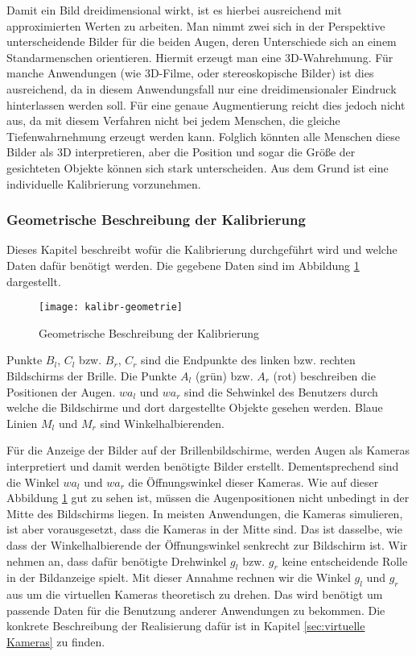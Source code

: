Damit ein Bild dreidimensional wirkt, ist es hierbei ausreichend mit approximierten Werten zu arbeiten.
Man nimmt zwei sich in der Perspektive unterscheidende Bilder für die beiden Augen, deren Unterschiede sich an einem Standarmenschen orientieren. 
Hiermit erzeugt man eine 3D-Wahrehmung. 
Für manche Anwendungen (wie 3D-Filme, oder stereoskopische Bilder) ist dies ausreichend, da in diesem Anwendungsfall nur eine dreidimensionaler Eindruck hinterlassen werden soll. 
Für eine genaue Augmentierung reicht dies jedoch nicht aus, da mit diesem Verfahren nicht bei jedem Menschen, die gleiche Tiefenwahrnehmung erzeugt werden kann.
Folglich könnten alle Menschen diese Bilder als 3D interpretieren, aber die Position und sogar die Größe der gesichteten Objekte können sich stark unterscheiden. 
Aus dem Grund ist eine individuelle Kalibrierung vorzunehmen.


\subsubsection{Geometrische Beschreibung der Kalibrierung}
\label{sec:Geometrische Beschreibung der Kalibrierung}
Dieses Kapitel beschreibt wofür die Kalibrierung durchgeführt wird und welche Daten dafür benötigt werden.
Die gegebene Daten sind im Abbildung \ref{fig:geom} dargestellt. 

\begin{figure}[h]
   \centering
   \texttt{[image: kalibr-geometrie]}
   \caption{Geometrische Beschreibung der Kalibrierung}
   \label{fig:geom}
\end{figure}

Punkte $B_{l}$, $C_{l}$ bzw. $B_{r}$, $C_{r}$ sind die Endpunkte des linken bzw. rechten Bildschirms der Brille.
Die Punkte $A_{l}$ (grün) bzw. $A_{r}$ (rot) beschreiben die Positionen der Augen.
$wa_{l}$ und $wa_{r}$ sind die Sehwinkel des Benutzers durch welche die Bildschirme und dort dargestellte Objekte gesehen werden. 
Blaue Linien $M_{l}$ und $M_{r}$ sind Winkelhalbierenden.

Für die Anzeige der Bilder auf der Brillenbildschirme, werden Augen als Kameras interpretiert und damit werden benötigte Bilder erstellt.
Dementsprechend sind die Winkel $wa_{l}$ und $wa_{r}$ die Öffnungswinkel dieser Kameras.
Wie auf dieser Abbildung \ref{fig:geom} gut zu sehen ist, müssen die Augenpositionen nicht unbedingt in der Mitte des Bildschirms liegen.
In meisten Anwendungen, die Kameras simulieren, ist aber vorausgesetzt, dass die Kameras in der Mitte sind.
Das ist dasselbe, wie dass der Winkelhalbierende der Öffnungswinkel senkrecht zur Bildschirm ist.
Wir nehmen an, dass dafür benötigte Drehwinkel $g_{l}$ bzw. $g_{r}$ keine entscheidende Rolle in der Bildanzeige spielt.
Mit dieser Annahme rechnen wir die Winkel $g_{l}$ und  $g_{r}$ aus  um die virtuellen Kameras theoretisch zu drehen.
Das wird benötigt um passende Daten für die Benutzung anderer Anwendungen zu bekommen. Die konkrete Beschreibung der Realisierung dafür ist in Kapitel  \ref{sec:virtuelle Kameras} zu finden.


